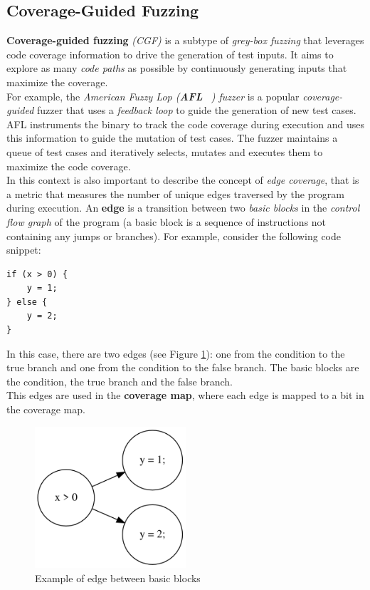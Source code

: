 \subsection{Coverage-Guided Fuzzing}
\label{sec:coverageguidedfuzzing}
\textbf{Coverage-guided fuzzing} \textit{(CGF)} is a subtype of \textit{grey-box fuzzing} that leverages code coverage information to drive the generation of test inputs. It aims to explore as many \textit{code paths} as possible by continuously generating inputs that maximize the coverage.
\\For example, the \textit{American Fuzzy Lop (\textbf{AFL} ~\cite{afl}) fuzzer} is a popular \textit{coverage-guided} fuzzer that uses a \textit{feedback loop} to guide the generation of new test cases. AFL instruments the binary to track the code coverage during execution and uses this information to guide the mutation of test cases. The fuzzer maintains a queue of test cases and iteratively selects, mutates and executes them to maximize the code coverage.
\\In this context is also important to describe the concept of \textit{edge coverage}, that is a metric that measures the number of unique edges traversed by the program during execution. An \textbf{edge} is a transition between two \textit{basic blocks} in the \textit{control flow graph} of the program (a basic block is a sequence of instructions not containing any jumps or branches).
For example, consider the following code snippet:
\begin{lstlisting}
if (x > 0) {
    y = 1;
} else {
    y = 2;
}
\end{lstlisting}
In this case, there are two edges (see Figure \ref{fig:sample_edge_graph}): one from the condition to the true branch and one from the condition to the false branch. The basic blocks are the condition, the true branch and the false branch.
\\This edges are used in the \textbf{coverage map}, where each edge is mapped to a bit in the coverage map.
\begin{figure}[H]
    \centering
    \includegraphics[width=0.5\textwidth]{Images/sample_edge_graph.png}
    \caption{Example of edge between basic blocks}
    \label{fig:sample_edge_graph}
\end{figure}
